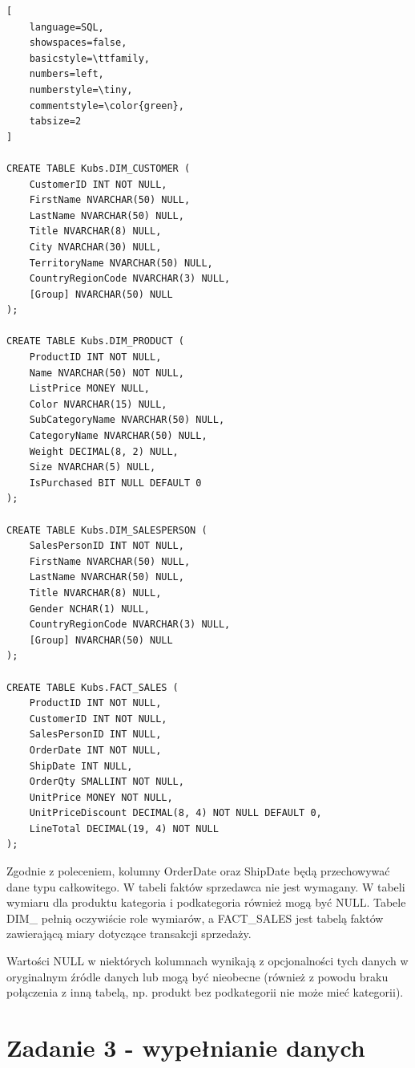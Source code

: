 \documentclass[a4paper,12pt]{article}
\begin{document}
 {\small
  \begin{lstlisting}[
	language=SQL,
	showspaces=false,
	basicstyle=\ttfamily,
	numbers=left,
	numberstyle=\tiny,
	commentstyle=\color{green},
	tabsize=2
]

CREATE TABLE Kubs.DIM_CUSTOMER (
    CustomerID INT NOT NULL,
    FirstName NVARCHAR(50) NULL,
    LastName NVARCHAR(50) NULL,
    Title NVARCHAR(8) NULL,
    City NVARCHAR(30) NULL,
    TerritoryName NVARCHAR(50) NULL,
    CountryRegionCode NVARCHAR(3) NULL,
    [Group] NVARCHAR(50) NULL
);

CREATE TABLE Kubs.DIM_PRODUCT (
    ProductID INT NOT NULL,
    Name NVARCHAR(50) NOT NULL,
    ListPrice MONEY NULL,
    Color NVARCHAR(15) NULL,
    SubCategoryName NVARCHAR(50) NULL,
    CategoryName NVARCHAR(50) NULL,
    Weight DECIMAL(8, 2) NULL,
    Size NVARCHAR(5) NULL,
    IsPurchased BIT NULL DEFAULT 0
);

CREATE TABLE Kubs.DIM_SALESPERSON (
    SalesPersonID INT NOT NULL,
    FirstName NVARCHAR(50) NULL,
    LastName NVARCHAR(50) NULL,
    Title NVARCHAR(8) NULL,
    Gender NCHAR(1) NULL,
    CountryRegionCode NVARCHAR(3) NULL,
    [Group] NVARCHAR(50) NULL
);

CREATE TABLE Kubs.FACT_SALES (
    ProductID INT NOT NULL,
    CustomerID INT NOT NULL,
    SalesPersonID INT NULL,      
    OrderDate INT NOT NULL,        
    ShipDate INT NULL,             
    OrderQty SMALLINT NOT NULL, 
    UnitPrice MONEY NOT NULL,
    UnitPriceDiscount DECIMAL(8, 4) NOT NULL DEFAULT 0,
    LineTotal DECIMAL(19, 4) NOT NULL
);
\end{lstlisting}}

Zgodnie z poleceniem, kolumny OrderDate oraz ShipDate będą przechowywać dane typu całkowitego.
W tabeli faktów sprzedawca nie jest wymagany.
W tabeli wymiaru dla produktu kategoria i podkategoria również mogą być NULL.
Tabele DIM\_\* pełnią oczywiście role wymiarów, a FACT\_SALES jest tabelą faktów zawierającą miary dotyczące transakcji sprzedaży.

Wartości NULL w niektórych kolumnach wynikają z opcjonalności tych danych w oryginalnym źródle danych lub mogą być nieobecne (również z powodu braku połączenia z inną tabelą, np. produkt bez podkategorii nie może mieć kategorii).


\section{Zadanie 3 - wypełnianie danych}
\end{document}
